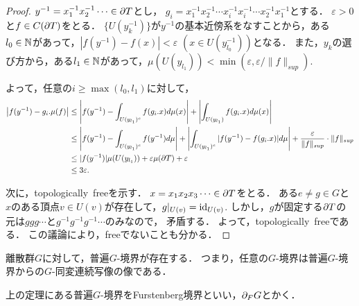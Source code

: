 \documentclass{jsarticle}[12pt]
\begin{document}
\begin{example}[$\F_2$]
\begin{proof}
    $y^{-1} = x_1^{-1}x_2^{-1}\cdots \in \frak{\partial} T$とし，
    $g_i = x_1^{-1}x_2^{-1} \cdots x_i^{-1} x_i^{-1} \cdots x_2^{-1}x_1^{-1}$とする．
    $\varepsilon > 0$と$f \in C(\frak{\partial} T)$をとる．
    $\{U(y_k^{-1})\}$が$y^{-1}$の基本近傍系をなすことから，ある$l_0 \in \mathbb{N}$があって，$|f(y^{-1}) - f(x)| < \varepsilon$ $(x \in U(y^{-1}_{l_0}))$となる．
    また，$y_k$の選び方から，ある$l_1 \in \mathbb{N}$があって，$\mu(U(y_{l_1})) < \min(\varepsilon, \varepsilon / \|f\|_{sup})$.
    
    よって，任意の$i \geq \max(l_0,l_1)$に対して，
    \begin{align*}
      \left|f(y^{-1}) - g_i.\mu(f)\right| &\leq \left|f(y^{-1}) - \int_{U(y_{l_1})^c}f(g_i.x) d\mu(x)\right| + \left|\int_{U(y_{l_1})}f(g_i.x) d\mu(x)\right|\\
      &\leq \left|f(y^{-1}) - \int_{U(y_{l_1})^c}f(y^{-1})d\mu\right| + \left| \int_{U(y_{l_1})^c}|f(y^{-1}) - f(g_i.x)|d\mu \right|+ \frac{\varepsilon}{\|f\|_{sup}}\cdot \|f\|_{sup}\\
      &\leq |f(y^{-1})|\mu(U(y_{l_1})) + \varepsilon\mu(\frak{\partial} T) + \varepsilon\\
      &\leq 3\varepsilon.
    \end{align*}

    次に，topologically\, freeを示す．
    $x = x_1x_2x_3 \cdots \in \frak{\partial} T$をとる．
    ある$e \neq g \in G$と$x$のある頂点$v \in U(v)$が存在して，$g|_{U(v)} = {\rm id}_{U(v)}$.
    しかし，$g$が固定する$\frak{\partial} T$の元は$ggg\cdots$と$g^{-1}g^{-1}g^{-1}\cdots$のみなので，
    矛盾する．
    よって，topologically\, freeである．
    この議論により，freeでないことも分かる．    
  \end{proof}
\end{example}
\begin{theorem}
  離散群$G$に対して，普遍$G$-境界が存在する．
  つまり，任意の$G$-境界は普遍$G$-境界からの$G$-同変連続写像の像である．
\end{theorem}

\begin{definition}
  上の定理にある普遍$G$-境界をFurstenberg境界といい，$\frak{\partial}_F G$とかく．
\end{definition}
\end{document}
